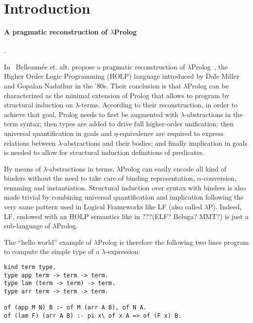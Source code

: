 \documentclass{easychair}
\begin{document}
\section{Introduction}

\paragraph{A pragmatic reconstruction of $\lambda$Prolog}.

In~\cite{jlp98} Belleannée et. alt. propose a pragmatic reconstruction
of $\lambda$Prolog~\cite{lambdap1,lambdap2,lambdap3}, the Higher Order
Logic Programming (HOLP) language introduced by Dale Miller and
Gopalan Nadathur in the '80s.
Their conclusion is that $\lambda$Prolog can be characterized as the
minimal extension of Prolog that allows to program by structural
induction on $\lambda$-terms. According to their reconstruction, in
order to achieve that goal, Prolog needs to first be augmented with
$\lambda$-abstractions in the term syntax; then types are added to
drive full higher-order unification; then universal quantification in
goals and $\eta$-equivalence are required to express relations between
$\lambda$-abstractions and their bodies; and finally implication in
goals is needed to allow for structural induction definitions of
predicates.

By means of $\lambda$-abstractions in terms, $\lambda$Prolog can
easily encode all kind of binders without the need to take care of
binding representation, $\alpha$-conversion, renaming and
instantiation. Structural induction over syntax with binders is also
made trivial by combining universal quantification and implication
following the very same pattern used in Logical Frameworks like LF
(also called $\lambda$P). Indeed, LF, endowed with an HOLP semantics
like in ???(ELF? Beluga? MMT?) is just a sub-language of
$\lambda$Prolog.

The ``hello world'' example of $\lambda$Prolog is therefore the
following two lines program to compute the simple type of a
$\lambda$-expression:

\begin{verbatim}
kind term type.
type app term -> term -> term.
type lam (term -> term) -> term.
type arr term -> term -> term.

of (app M N) B :- of M (arr A B), of N A.
of (lam F) (arr A B) :- pi x\ of x A => of (F x) B.
\end{verbatim}
\end{document}
